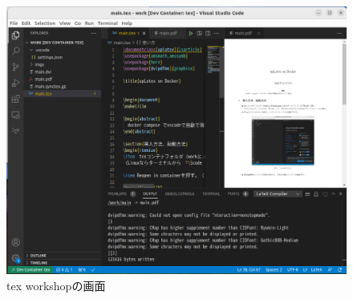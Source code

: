 \documentclass[uplatex]{jsarticle}
\begin{document}
\begin{figure}[H]
  \centering
  \includegraphics[width=0.7 \linewidth]{imgs/tex_workshop.png}
  \caption{tex workshopの画面}
\end{figure}
\end{document}
